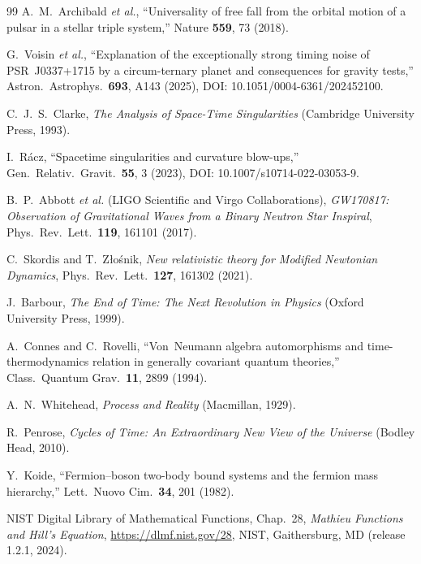 \begin{thebibliography}{99}
A.~M.~Archibald \textit{et al.},
``Universality of free fall from the orbital motion of a pulsar in a stellar triple system,''
Nature \textbf{559}, 73 (2018).

G.~Voisin \textit{et al.},
``Explanation of the exceptionally strong timing noise of PSR~J0337+1715 by a circum-ternary planet and consequences for gravity tests,''
Astron.\ Astrophys.\ \textbf{693}, A143 (2025),
DOI: 10.1051/0004-6361/202452100.

C.~J.~S.~Clarke,
\emph{The Analysis of Space-Time Singularities}
(Cambridge University Press, 1993).

I.~R\'acz,
``Spacetime singularities and curvature blow-ups,''
Gen.\ Relativ.\ Gravit.\ \textbf{55}, 3 (2023),
DOI: 10.1007/s10714-022-03053-9.

B.~P.~Abbott \emph{et al.} (LIGO Scientific and Virgo Collaborations),
\emph{GW170817: Observation of Gravitational Waves from a Binary Neutron Star Inspiral},
Phys.\ Rev.\ Lett.\ \textbf{119}, 161101 (2017).

C.~Skordis and T.~Z\l{}o\'snik,
\emph{New relativistic theory for Modified Newtonian Dynamics},
Phys.\ Rev.\ Lett.\ \textbf{127}, 161302 (2021).

J.~Barbour,
\emph{The End of Time: The Next Revolution in Physics}
(Oxford University Press, 1999).

A.~Connes and C.~Rovelli,
``Von~Neumann algebra automorphisms and time-thermodynamics relation
in generally covariant quantum theories,''
Class.\ Quantum Grav.\ \textbf{11}, 2899 (1994).

A.~N.~Whitehead,
\emph{Process and Reality}
(Macmillan, 1929).

R.~Penrose,
\emph{Cycles of Time: An Extraordinary New View of the Universe}
(Bodley Head, 2010).


Y.~Koide,
``Fermion--boson two-body bound systems and the fermion mass hierarchy,''
Lett.\ Nuovo Cim.\ \textbf{34}, 201 (1982).

NIST Digital Library of Mathematical Functions,
Chap.~28, \textit{Mathieu Functions and Hill's Equation},
\url{https://dlmf.nist.gov/28},
NIST, Gaithersburg, MD (release 1.2.1, 2024).


\end{thebibliography}
